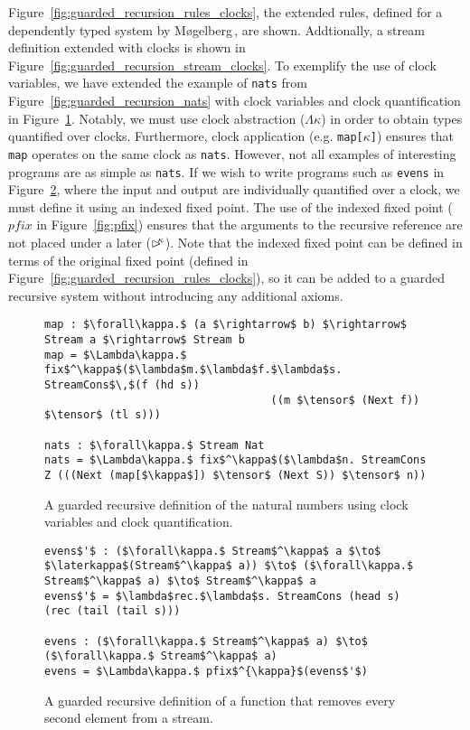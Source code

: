 Figure~\ref{fig:guarded_recursion_rules_clocks}, the extended rules, defined for
a dependently typed system by M\o gelberg\,\citep{Mogelberg:2014}, are
shown. Addtionally, a stream definition extended with clocks is shown in
Figure~\ref{fig:guarded_recursion_stream_clocks}. To exemplify the use of clock
variables, we have extended the example of \texttt{nats} from
Figure~\ref{fig:guarded_recursion_nats} with clock variables and clock
quantification in Figure~\ref{fig:guarded_recursion_nats_with_clocks}. Notably,
we must use clock abstraction ($\Lambda\kappa$) in order to obtain types
quantified over clocks. Furthermore, clock application
(e.g. \texttt{map[$\kappa$]}) ensures that \texttt{map} operates on the same
clock as \texttt{nats}. However, not all examples of interesting programs are as
simple as \texttt{nats}. If we wish to write programs such as
\texttt{evens} in Figure~\ref{fig:guarded_recursion_evens}, where the
input and output are individually quantified over a clock, we must define it using an
indexed fixed point. The use of the indexed fixed point ($\mathit{pfix}$ in
Figure~\ref{fig:pfix}) ensures that the arguments to the recursive reference are
not placed under a later ($\rhd^{\!\!\kappa}$). Note that the indexed fixed point can
be defined in terms of the original fixed point (defined in
Figure~\ref{fig:guarded_recursion_rules_clocks}), so it can be added to a
guarded recursive system without introducing any additional axioms.
\begin{figure}
\begin{lstlisting}[mathescape]
map : $\forall\kappa.$ (a $\rightarrow$ b) $\rightarrow$ Stream a $\rightarrow$ Stream b
map = $\Lambda\kappa.$ fix$^\kappa$($\lambda$m.$\lambda$f.$\lambda$s. StreamCons$\,$(f (hd s)) 
                                   ((m $\tensor$ (Next f)) $\tensor$ (tl s)))

nats : $\forall\kappa.$ Stream Nat
nats = $\Lambda\kappa.$ fix$^\kappa$($\lambda$n. StreamCons Z (((Next (map[$\kappa$]) $\tensor$ (Next S)) $\tensor$ n))
\end{lstlisting}
%
\caption{A guarded recursive definition of the natural numbers using clock
  variables and clock quantification.}
\label{fig:guarded_recursion_nats_with_clocks}
\end{figure}

\begin{figure}
\begin{lstlisting}[mathescape]
evens$'$ : ($\forall\kappa.$ Stream$^\kappa$ a $\to$ $\laterkappa$(Stream$^\kappa$ a)) $\to$ ($\forall\kappa.$ Stream$^\kappa$ a) $\to$ Stream$^\kappa$ a
evens$'$ = $\lambda$rec.$\lambda$s. StreamCons (head s) (rec (tail (tail s)))

evens : ($\forall\kappa.$ Stream$^\kappa$ a) $\to$ ($\forall\kappa.$ Stream$^\kappa$ a)
evens = $\Lambda\kappa.$ pfix$^{\kappa}$(evens$'$)
\end{lstlisting}
\caption{A guarded recursive definition of a function that removes every second element from a stream.}
\label{fig:guarded_recursion_evens}
\end{figure}

